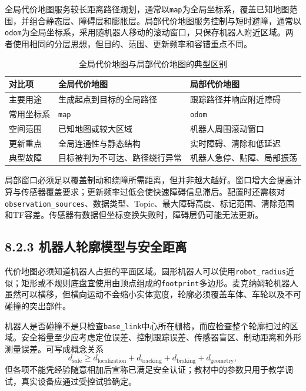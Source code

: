 \documentclass[UTF8,zihao=-4]{ctexart}
\begin{document}
全局代价地图服务较长距离路径规划，通常以\texttt{map}为全局坐标系，覆盖已知地图范围，并组合静态层、障碍层和膨胀层。局部代价地图服务控制与短时避障，通常以\texttt{odom}为全局坐标系，采用随机器人移动的滚动窗口，只保存机器人附近区域。两者使用相同的分层思想，但目的、范围、更新频率和容错重点不同。

\begin{table}[htbp]
  \centering
  \caption{全局代价地图与局部代价地图的典型区别}
  \begin{tabular}{p{}p{}p{}}
    \toprule
    对比项 & 全局代价地图 & 局部代价地图 \\
    \midrule
    主要用途 & 生成起点到目标的全局路径 & 跟踪路径并响应附近障碍 \\
    常用坐标系 & \texttt{map} & \texttt{odom} \\
    空间范围 & 已知地图或较大区域 & 机器人周围滚动窗口 \\
    更新重点 & 全局连通性与静态结构 & 实时障碍、清除和低延迟 \\
    典型故障 & 目标被判为不可达、路径绕行异常 & 机器人急停、贴障、局部振荡 \\
    \bottomrule
  \end{tabular}
\end{table}

局部窗口必须足以覆盖制动和绕障所需距离，但并非越大越好。窗口增大会提高计算与传感器覆盖要求；更新频率过低会使快速障碍信息滞后。配置时还需核对\texttt{observation\_sources}、数据类型、Topic、最大障碍高度、标记范围、清除范围和TF容差。传感器有数据但坐标变换失败时，障碍层仍可能无法更新。

\subsection*{8.2.3 机器人轮廓模型与安全距离}

代价地图必须知道机器人占据的平面区域。圆形机器人可以使用\texttt{robot\_radius}近似；矩形或不规则底盘宜使用由顶点组成的\texttt{footprint}多边形。麦克纳姆轮机器人虽然可以横移，但横向运动不会缩小实体宽度，轮廓必须覆盖车体、车轮以及不可碰撞的突出部件。

机器人是否碰撞不是只检查\texttt{base\_link}中心所在栅格，而应检查整个轮廓扫过的区域。安全裕量至少应考虑定位误差、控制跟踪误差、传感器盲区、制动距离和外形测量误差。可写成概念关系
\begin{equation}
  d_{\mathrm{safe}}
  \ge d_{\mathrm{localization}}+d_{\mathrm{tracking}}+d_{\mathrm{braking}}+d_{\mathrm{geometry}},
  \label{eq:safety-margin}
\end{equation}
但各项不能凭经验随意相加后宣称已满足安全认证；教材中的参数只用于教学调试，真实设备应通过受控试验确定。
\end{document}
